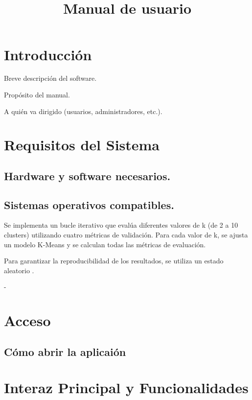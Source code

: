 \documentclass{Pretexto/bluereport}
\title{Manual de usuario}
\author{}
\date{}
\begin{document}

\tableofcontents
\pagebreak

\section{Introducción}

Breve descripción del software.

Propósito del manual.

A quién va dirigido (usuarios, administradores, etc.).

\section{Requisitos del Sistema}

\subsection{Hardware y software necesarios.}


\subsection{Sistemas operativos compatibles.}

Se implementa un bucle iterativo que evalúa diferentes valores de k (de 2 a 10 clusters) utilizando cuatro métricas de validación. Para cada valor de k, se ajusta un modelo K-Means y se calculan todas las métricas de evaluación.

\begin{importante}
Para garantizar la reproducibilidad de los resultados, se utiliza un estado aleatorio .
\end{importante}
-


\section{Acceso}
\subsection{Cómo abrir la aplicaión}

\section{Interaz Principal y Funcionalidades}
\end{document}

